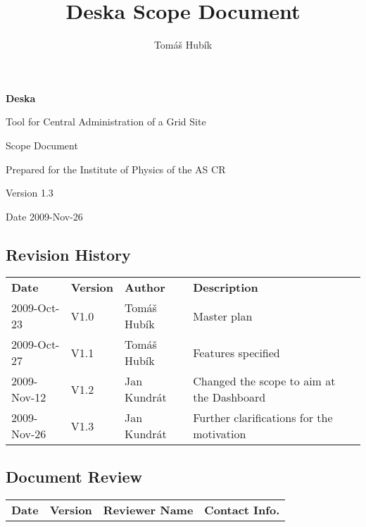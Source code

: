 \documentclass[12pt]{article}
\author{Tomáš Hubík}
\title{Deska Scope Document}
\begin{document}
{\Huge \textbf{Deska}}

\vspace{0.2in}

{\large Tool for Central Administration of a Grid Site}

\vspace{0.5in}

{\large Scope Document}

\vspace{0.2in}

{\large Prepared for the Institute of Physics of the AS CR}

\vspace{0.2in}

{\large Version 1.3}

\vspace{0.2in}

{\large Date 2009-Nov-26}

\vspace{0.5in}

\subsection*{Revision History}

\begin{table}[!h]
	\begin{tabular}{l l l l}
		\textbf{Date} & \textbf{Version} & \textbf{Author} & \textbf{Description} \\
		2009-Oct-23 & V1.0 & Tomáš Hubík & Master plan \\
		2009-Oct-27 & V1.1 & Tomáš Hubík & Features specified \\
		2009-Nov-12 & V1.2 & Jan Kundrát & Changed the scope to aim at the
        Dashboard \\
		2009-Nov-26 & V1.3 & Jan Kundrát & Further clarifications for the
        motivation
	\end{tabular}
	\label{tab:RevisionHistory}
\end{table}


\subsection*{Document Review}

\begin{table}[!h]
	\begin{tabular}{l l l l}
		\textbf{Date} & \textbf{Version} & \textbf{Reviewer Name} & \textbf{Contact Info.} \\
	\end{tabular}
	\label{tab:DocumentReview}
\end{table}
\end{document}
